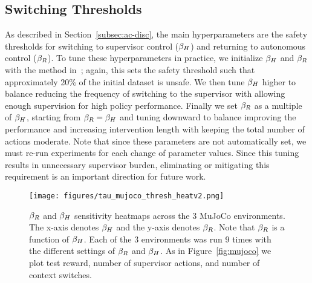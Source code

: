 \begin{table}[!htbp]
\centering
{}
\caption{\textbf{MuJoCo Hyperparameters:} $|S|$ and $|A|$ are aspects of the Gym environments while the other values are hyperparameters of LazyDAgger (Algorithm~\ref{alg:main}). Note that $T$ and $\tausup$ are the same across all environments, and that $\tauauto$ is a function of $\tausup$.}
\label{tab:mujoco-params}
\end{table}

\subsection{\algabbr Switching Thresholds}
As described in Section~\ref{subsec:ac-disc}, the main \algabbr hyperparameters are the safety thresholds for switching to supervisor control ($\tausup$) and returning to autonomous control ($\tauauto$). To tune these hyperparameters in practice, we initialize $\tausup$ and $\tauauto$ with the method in~\citet{safe_dagger}; again, this sets the safety threshold such that approximately 20\% of the initial dataset is unsafe. We then tune $\tausup$ higher to balance reducing the frequency of switching to the supervisor with allowing enough supervision for high policy performance. Finally we set $\tauauto$ as a multiple of $\tausup$, starting from $\beta_{R} = \beta_{H}$ and tuning downward to balance improving the performance and increasing intervention length with keeping the total number of actions moderate. Note that since these parameters are not automatically set, we must re-run experiments for each change of parameter values. Since this tuning results in unnecessary supervisor burden, eliminating or mitigating this requirement is an important direction for future work.

\begin{figure}[t]
\center
\texttt{[image: figures/tau\_mujoco\_thresh\_heatv2.png]}
\caption{
\algabbr $\tauauto$ and $\tausup$ sensitivity heatmaps across the 3 MuJoCo environments.  The x-axis denotes $\tausup$ and the y-axis denotes $\tauauto$.  Note that $\tauauto$ is a function of $\tausup$.  Each of the 3 environments was run 9 times with the different settings of $\tauauto$ and $\tausup$. As in Figure~\ref{fig:mujoco} we plot test reward, number of supervisor actions, and number of context switches.}
\label{fig:tau_heat_map}
\end{figure}

